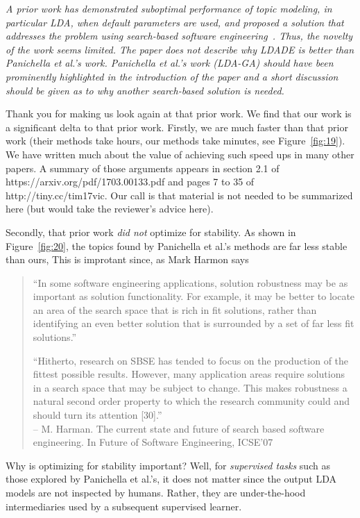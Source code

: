 \documentclass[conference]{IEEEtran}
\newcommand{\fig}[1]{Figure~\ref{fig:#1}}
\begin{document}
\textit{A prior work has demonstrated suboptimal performance of topic modeling, in particular LDA, when default parameters are used, and proposed a solution that addresses the problem using search-based software engineering~\cite{panichella2013effectively}. Thus, the novelty of the work seems limited. The paper does not describe why LDADE is better than Panichella et al.'s work. Panichella et al.'s work (LDA-GA) should have been prominently highlighted in the introduction of the paper and a short discussion should be given as to why another search-based solution is needed.}

Thank you for making us look again at that prior work. We find that our  work is a significant delta to that prior work.
Firstly, we are much faster than that prior work (their methods take hours, our methods take minutes, see \fig{19}).
We have written much about the value of achieving such speed ups in many other papers. A summary  of those arguments appears in section 2.1 of https://arxiv.org/pdf/1703.00133.pdf  and  pages 7 to 35 of http://tiny.cc/tim17vic.
Our call is that material is not needed to be summarized here (but would take the reviewer's advice here).

Secondly, that prior work {\em did not} optimize for stability. As shown in \fig{20}, the topics found by  Panichella et al.'s methods are far less stable than ours, This is improtant since, as Mark Harmon says
\begin{quote}
``In some software engineering applications, solution robustness may be as important
as solution functionality. For example, it may be better to locate an area
of the search space that is rich in fit solutions, rather than identifying an even
better solution that is surrounded by a set of far less fit solutions.''

``Hitherto, research on SBSE has tended to focus on the production of the fittest
possible results. However, many application areas require solutions in a search
space that may be subject to change. This makes robustness a natural second
order property to which the research community could and should turn its attention
[30].'' \\
-- M. Harman. The current state and future of search based software engineering. In Future of
Software Engineering, ICSE'07
\end{quote}
Why is optimizing for stability important? Well, for {\em supervised tasks} such as those explored by  Panichella et al.'s, it does not matter since the output LDA models are not inspected by humans. Rather, they are under-the-hood intermediaries
used by a subsequent supervised learner.
\end{document}
